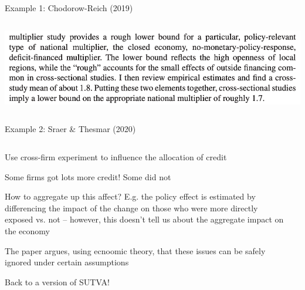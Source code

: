 \documentclass[notes,11pt, aspectratio=169]{beamer}
\newenvironment{wideitemize}{\itemize\addtolength{\itemsep}{10pt}}{\enditemize}
\begin{document}
\begin{frame}{Example 1: Chodorow-Reich (2019)}
\begin{columns}[T]
\begin{column}{.5\textwidth}
\begin{center}
            \includegraphics[width=\linewidth]{images/chodorowreich4.png}\\
    \end{center}
  \end{column}
\end{columns}
\end{frame}


\begin{frame}{Example 2: Sraer \& Thesmar (2020)}
\begin{columns}[T] %
  \begin{column}{.5\textwidth}
    \begin{wideitemize}
    \item Use cross-firm experiment to influence the allocation of credit
    \item Some firms got lots more credit! Some did not
    \item How to aggregate up this affect? E.g. the policy effect is
      estimated by differencing the impact of the change on those who
      were more directly exposed vs. not -- however, this doesn't tell
      us about the aggregate impact on the economy
    \item The paper argues, using ecnoomic theory, that these issues can be safely ignored under certain assumptions
    \item Back to a version of SUTVA!
    \end{wideitemize}
  \end{column}%
  \hfill%
  \begin{column}{.5\textwidth}
    \begin{center}
\end{center}
\end{column}
\end{columns}
\end{frame}
\end{document}
